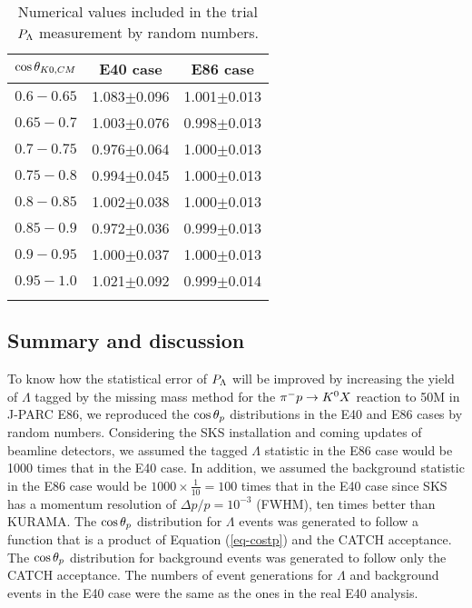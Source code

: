 
\begin{table}[!h] 
  \begin{center}
  \caption{Numerical values included in the trial $P_{\Lambda}$ measurement by random numbers.}
    \begin{tabular}{ccc}
    $\cos{\theta_{K0,CM}}$ & E40 case & E86 case  \\
    \midrule\midrule
    $0.6-0.65$ & 1.083$\pm$0.096 & 1.001$\pm$0.013  \\
    \midrule
    $0.65-0.7$ & 1.003$\pm$0.076 & 0.998$\pm$0.013 \\
    \midrule
    $0.7-0.75$ & 0.976$\pm$0.064 & 1.000$\pm$0.013 \\
    \midrule
    $0.75-0.8$ & 0.994$\pm$0.045 & 1.000$\pm$0.013 \\
    \midrule
    $0.8-0.85$ & 1.002$\pm$0.038 & 1.000$\pm$0.013 \\
    \midrule
    $0.85-0.9$ & 0.972$\pm$0.036 & 0.999$\pm$0.013 \\
    \midrule
    $0.9-0.95$ & 1.000$\pm$0.037 & 1.000$\pm$0.013 \\
    \midrule 
    $0.95-1.0$ & 1.021$\pm$0.092 & 0.999$\pm$0.014 \\
    \label{tab-randPl}
    \end{tabular}
  \end{center}
\end{table}



\subsection{Summary and discussion}
To know how the statistical error of $P_{\Lambda}$ will be improved by increasing the yield of $\Lambda$ tagged by the missing mass method for the $\pi^- p \to K^0 X$ reaction to 50M in J-PARC E86, we reproduced the $\cos{\theta_p}$ distributions in the E40 and E86 cases by random numbers. Considering the SKS installation and coming updates of beamline detectors, we assumed the tagged $\Lambda$ statistic in the E86 case would be 1000 times that in the E40 case. In addition, we assumed the background statistic in the E86 case would be $1000\times\frac{1}{10}=100$ times that in the E40 case since SKS has a momentum resolution of $\Delta p/p = 10^{-3}$ (FWHM), ten times better than KURAMA. The $\cos{\theta_p}$ distribution for $\Lambda$ events was generated to follow a function that is a product of Equation (\ref{eq-costp}) and the CATCH acceptance. The $\cos{\theta_p}$ distribution for background events was generated to follow only the CATCH acceptance. The numbers of event generations for $\Lambda$ and background events in the E40 case were the same as the ones in the real E40 analysis. 

